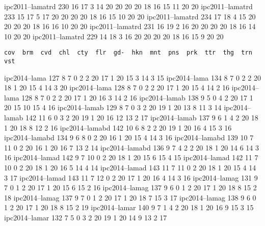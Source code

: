 ipc2011--lamatrd  230  16   17   3    14   20   20   20   20   18   16   15   11   20   20
ipc2011--lamatrd  233  15   17   5    17   20   20   20   20   18   16   15   10   20   20
ipc2011--lamatrd  234  17   18   4    15   20   20   20   20   18   16   16   10   20   20
ipc2011--lamatrd  231  16   19   2    16   20   20   20   20   18   16   14   10   20   20
ipc2011--lamatrd  229  14   18   3    16   20   20   20   20   18   16   15   9    20   20
\begin{verbatim}
cov  brm  cvd  chl  cty  flr  gd-  hkn  mnt  pns  prk  ttr  thg  trn  vst
\end{verbatim}
ipc2014--lama     127  8    7    0    2    2    20   17   1    20   15   3    14   3    15
ipc2014--lama     134  8    7    0    2    2    20   18   1    20   15   4    14   3    20
ipc2014--lama     128  8    7    0    2    2    20   17   1    20   15   4    14   2    16
ipc2014--lama     128  8    7    0    2    2    20   17   1    20   16   3    14   2    16
ipc2014--lamab    138  9    5    0    4    2    20   17   1    20   15   10   15   4    16
ipc2014--lamab    129  8    7    0    3    2    20   19   1    20   13   8    11   3    14
ipc2014--lamab    142  11   6    0    3    2    20   19   1    20   16   12   13   2    17
ipc2014--lamab    137  9    6    1    4    2    20   18   1    20   18   8    12   2    16
ipc2014--lamabd   142  10   6    8    2    2    20   19   1    20   16   4    15   3    16
ipc2014--lamabd   134  9    6    8    0    2    20   16   1    20   15   4    14   3    16
ipc2014--lamabd   139  10   7    11   0    2    20   16   1    20   16   7    13   2    14
ipc2014--lamabd   136  9    7    4    2    2    20   18   1    20   14   6    14   3    16
ipc2014--lamad    142  9    7    10   0    2    20   18   1    20   15   6    15   4    15
ipc2014--lamad    142  11   7    10   0    2    20   18   1    20   16   5    14   4    14
ipc2014--lamad    143  11   7    11   0    2    20   18   1    20   15   4    14   3    17
ipc2014--lamad    143  11   7    12   0    2    20   17   1    20   16   4    14   3    16
ipc2014--lamag    131  9    7    0    1    2    20   17   1    20   15   6    15   2    16
ipc2014--lamag    137  9    6    0    1    2    20   17   1    20   18   8    15   2    18
ipc2014--lamag    137  9    7    0    1    2    20   17   1    20   18   7    15   3    17
ipc2014--lamag    138  9    6    0    1    2    20   17   1    20   18   8    15   2    19
ipc2014--lamar    140  9    7    1    4    2    20   18   1    20   16   9    15   3    15
ipc2014--lamar    132  7    5    0    3    2    20   19   1    20   14   9    13   2    17
